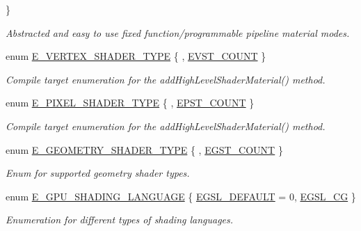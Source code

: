 \begin{DoxyCompactItemize}
 \}\begin{DoxyCompactList}\small\item\em Abstracted and easy to use fixed function/programmable pipeline material modes. \end{DoxyCompactList}
\item 
enum \hyperlink{namespaceirr_1_1video_a9decae50d4dc2455e7b009f5c71b24f9}{E\+\_\+\+V\+E\+R\+T\+E\+X\+\_\+\+S\+H\+A\+D\+E\+R\+\_\+\+T\+Y\+PE} \{ , \hyperlink{namespaceirr_1_1video_a9decae50d4dc2455e7b009f5c71b24f9a7bcfbb56a27827b74d7490ac9b4c5805}{E\+V\+S\+T\+\_\+\+C\+O\+U\+NT}
 \}\begin{DoxyCompactList}\small\item\em Compile target enumeration for the add\+High\+Level\+Shader\+Material() method. \end{DoxyCompactList}
\item 
enum \hyperlink{namespaceirr_1_1video_a07fb77e9aec681402ad376f7ef9b724c}{E\+\_\+\+P\+I\+X\+E\+L\+\_\+\+S\+H\+A\+D\+E\+R\+\_\+\+T\+Y\+PE} \{ , \hyperlink{namespaceirr_1_1video_a07fb77e9aec681402ad376f7ef9b724ca71cefcf360894a2585c76a525a83e144}{E\+P\+S\+T\+\_\+\+C\+O\+U\+NT}
 \}\begin{DoxyCompactList}\small\item\em Compile target enumeration for the add\+High\+Level\+Shader\+Material() method. \end{DoxyCompactList}
\item 
enum \hyperlink{namespaceirr_1_1video_a3aad41cbdf894faaeeadf465592af18f}{E\+\_\+\+G\+E\+O\+M\+E\+T\+R\+Y\+\_\+\+S\+H\+A\+D\+E\+R\+\_\+\+T\+Y\+PE} \{ , \hyperlink{namespaceirr_1_1video_a3aad41cbdf894faaeeadf465592af18fa8671e215f014583cfffa1020f97a179b}{E\+G\+S\+T\+\_\+\+C\+O\+U\+NT}
 \}\begin{DoxyCompactList}\small\item\em Enum for supported geometry shader types. \end{DoxyCompactList}
\item 
enum \hyperlink{namespaceirr_1_1video_a913671e32f20f13e51336bfbe20a82a3}{E\+\_\+\+G\+P\+U\+\_\+\+S\+H\+A\+D\+I\+N\+G\+\_\+\+L\+A\+N\+G\+U\+A\+GE} \{ \hyperlink{namespaceirr_1_1video_a913671e32f20f13e51336bfbe20a82a3ac65c039e1c80a430a816c450a5f30d4b}{E\+G\+S\+L\+\_\+\+D\+E\+F\+A\+U\+LT} = 0, 
\hyperlink{namespaceirr_1_1video_a913671e32f20f13e51336bfbe20a82a3a703622fd615408677044b9ec67f5ea42}{E\+G\+S\+L\+\_\+\+CG}
 \}\begin{DoxyCompactList}\small\item\em Enumeration for different types of shading languages. \end{DoxyCompactList}

\end{DoxyCompactItemize}
